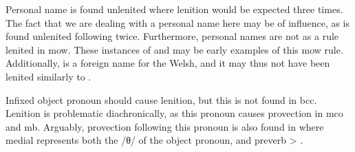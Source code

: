 Personal name  is found unlenited where lenition would be expected three times.
The fact that we are dealing with a personal name here may be of influence, as  is found unlenited following  twice.
Furthermore, personal names are not as a rule lenited in \gls{mow}.
These instances of  and  may be early examples of this \gls{mow} rule.
Additionally,  is a foreign name for the Welsh, and it may thus not have been lenited similarly to .

Infixed object pronoun  should cause lenition, but this is not found in \gls{bcc}.
Lenition is problematic diachronically, as this pronoun causes provection in \gls{mco} and \gls{mb}.
Arguably, provection following this pronoun is also found in  where medial  represents both the /θ/ of the object pronoun, and preverb  > .

